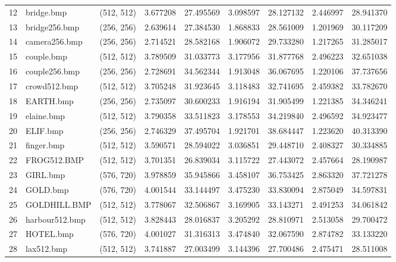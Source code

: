 \documentclass{article}
\begin{document}
\begin{table}[H]
\begin{adjustbox}{center}
\begin{tabular}{lllrrrrrr}
    12 &         bridge.bmp &  (512, 512) &  3.677208 &  27.495569 &  3.098597 &  28.127132 &  2.446997 &  28.941370 \\
    13 &      bridge256.bmp &  (256, 256) &  2.639614 &  27.384530 &  1.868833 &  28.561009 &  1.201969 &  30.117209 \\
    14 &      camera256.bmp &  (256, 256) &  2.714521 &  28.582168 &  1.906072 &  29.733280 &  1.217265 &  31.285017 \\
    15 &         couple.bmp &  (512, 512) &  3.789509 &  31.033773 &  3.177956 &  31.877768 &  2.496223 &  32.651038 \\
    16 &      couple256.bmp &  (256, 256) &  2.728691 &  34.562344 &  1.913048 &  36.067695 &  1.220106 &  37.737656 \\
    17 &       crowd512.bmp &  (512, 512) &  3.705248 &  31.923645 &  3.118483 &  32.741695 &  2.459382 &  33.782670 \\
    18 &          EARTH.bmp &  (256, 256) &  2.735097 &  30.600233 &  1.916194 &  31.905499 &  1.221385 &  34.346241 \\
    19 &         elaine.bmp &  (512, 512) &  3.790358 &  33.511823 &  3.178553 &  34.219840 &  2.496592 &  34.923477 \\
    20 &           ELIF.bmp &  (256, 256) &  2.746329 &  37.495704 &  1.921701 &  38.684447 &  1.223620 &  40.313390 \\
    21 &         finger.bmp &  (512, 512) &  3.590571 &  28.594022 &  3.036851 &  29.448710 &  2.408327 &  30.334885 \\
    22 &        FROG512.BMP &  (512, 512) &  3.701351 &  26.839034 &  3.115722 &  27.443072 &  2.457664 &  28.190987 \\
    23 &           GIRL.bmp &  (576, 720) &  3.978859 &  35.945866 &  3.458107 &  36.753425 &  2.863320 &  37.721278 \\
    24 &           GOLD.bmp &  (576, 720) &  4.001544 &  33.144497 &  3.475230 &  33.830094 &  2.875049 &  34.597831 \\
    25 &       GOLDHILL.BMP &  (512, 512) &  3.778067 &  32.506867 &  3.169905 &  33.143271 &  2.491253 &  34.061842 \\
    26 &     harbour512.bmp &  (512, 512) &  3.828443 &  28.016837 &  3.205292 &  28.810971 &  2.513058 &  29.700472 \\
    27 &          HOTEL.bmp &  (576, 720) &  4.001027 &  31.316313 &  3.474840 &  32.067590 &  2.874782 &  33.133220 \\
    28 &         lax512.bmp &  (512, 512) &  3.741887 &  27.003499 &  3.144396 &  27.700486 &  2.475471 &  28.511008 \\

\end{tabular}
\end{adjustbox}
\end{table}
\end{document}
